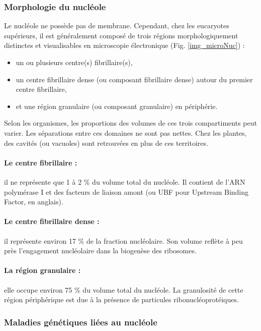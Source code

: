 \subsubsection{Morphologie du nucléole}
Le nucléole ne possède pas de membrane.  Cependant, chez les
eucaryotes supérieurs, il est généralement composé de trois régions
morphologiquement distinctes et visualisables en microscopie
électronique (Fig. \ref{img_microNuc}) :
\begin{itemize}
	\item un ou plusieurs centre(s) fibrillaire(s),
	\item un centre fibrillaire dense (ou composant fibrillaire dense) autour du premier centre fibrillaire, 
	\item et une région granulaire (ou composant granulaire) en périphérie. 
\end{itemize}
Selon les organismes, les proportions des volumes de ces trois compartiments peut varier.
Les séparations entre ces domaines ne sont pas nettes. 
Chez les plantes, des cavités (ou vacuoles) sont retrouvées en plus de ces territoires. 

\paragraph{Le centre fibrillaire :} il ne représente que 1 à 2 \% du volume total du nucléole. 
Il contient de l'ARN polymérase I et des facteurs de liaison amont (ou UBF pour Upstream Binding Factor, en anglais). 

\paragraph{Le centre fibrillaire dense :} il représente environ 17 \% de la fraction nucléolaire. 
Son volume reflète à peu près l'engagement nucléolaire dans la biogenèse des ribosomes. 

\paragraph{La région granulaire :} elle occupe environ 75 \% du volume total du nucléole. 
La granulosité de cette région périphérique est due à la présence de particules ribonucléoprotéiques. 


\subsubsection{Maladies génétiques liées au nucléole}

